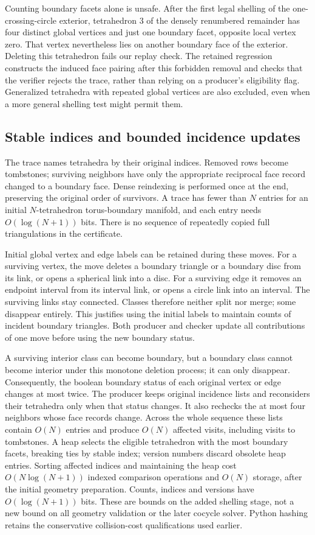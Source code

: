 Counting boundary facets alone is unsafe. After the first legal shelling of
the one-crossing-circle exterior, tetrahedron 3 of the densely renumbered remainder has four distinct
global vertices and just one boundary facet, opposite local vertex zero.
That vertex nevertheless lies on another boundary face of the exterior.
Deleting this tetrahedron fails our replay check. The retained regression
constructs the induced face pairing after this forbidden removal and checks
that the verifier rejects the trace, rather than relying on a producer's
eligibility flag. Generalized tetrahedra with repeated global vertices are
also excluded, even when a more general shelling test might permit them.

\subsection{Stable indices and bounded incidence updates}

The trace names tetrahedra by their original indices. Removed rows become
tombstones; surviving neighbors have only the appropriate reciprocal face
record changed to a boundary face. Dense reindexing is performed once at the
end, preserving the original order of survivors. A trace has fewer than $N$
entries for an initial $N$-tetrahedron torus-boundary manifold, and each entry
needs $O(\log(N+1))$ bits. There is no sequence of repeatedly copied full
triangulations in the certificate.

Initial global vertex and edge labels can be retained during these moves.
For a surviving vertex, the move deletes a boundary triangle or a boundary
disc from its link, or opens a spherical link into a disc. For a surviving
edge it removes an endpoint interval from its interval link, or opens a
circle link into an interval. The surviving links stay connected. Classes
therefore neither split nor merge; some disappear entirely. This justifies
using the initial labels to maintain counts of incident boundary triangles.
Both producer and checker update all contributions of one move before using
the new boundary status.

A surviving interior class can become boundary, but a boundary class cannot
become interior under this monotone deletion process; it can only disappear.
Consequently, the boolean boundary status of each original vertex or edge
changes at most twice. The producer keeps original incidence lists and
reconsiders their tetrahedra only when that status changes. It also rechecks
the at most four neighbors whose face records change. Across the whole
sequence these lists contain $O(N)$ entries and produce $O(N)$ affected
visits, including visits to tombstones. A heap selects the eligible tetrahedron
with the most boundary facets, breaking ties by stable index; version numbers
discard obsolete heap entries. Sorting affected indices and maintaining the
heap cost $O(N\log(N+1))$ indexed comparison operations and $O(N)$ storage,
after the initial geometry preparation. Counts, indices and versions have
$O(\log(N+1))$ bits. These are bounds on the added shelling stage, not a new
bound on all geometry validation or the later cocycle solver. Python hashing
retains the conservative collision-cost qualifications used earlier.

